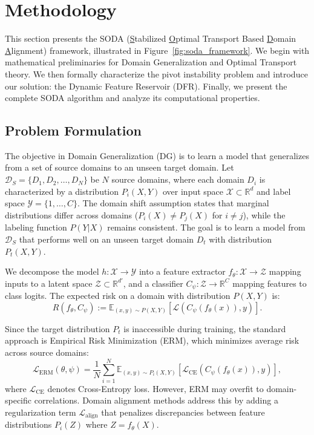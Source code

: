 \section{Methodology}
\label{sec:methodology}


This section presents the SODA (\underline{S}tabilized \underline{O}ptimal Transport Based \underline{D}omain \underline{A}lignment) framework, illustrated in Figure~\ref{fig:soda_framework}. We begin with mathematical preliminaries for Domain Generalization and Optimal Transport theory. We then formally characterize the pivot instability problem and introduce our solution: the Dynamic Feature Reservoir (DFR). Finally, we present the complete SODA algorithm and analyze its computational properties.

\subsection{Problem Formulation}
\label{ssec:problem}

The objective in Domain Generalization (DG) is to learn a model that generalizes from a set of source domains to an unseen target domain. Let $\mathcal{D}_S = \{D_1, D_2, \dots, D_N\}$ be $N$ source domains, where each domain $D_i$ is characterized by a distribution $P_i(X, Y)$ over input space $\mathcal{X} \subset \mathbb{R}^d$ and label space $\mathcal{Y} = \{1, \dots, C\}$. The domain shift assumption states that marginal distributions differ across domains ($P_i(X) \neq P_j(X)$ for $i \neq j$), while the labeling function $P(Y|X)$ remains consistent. The goal is to learn a model from $\mathcal{D}_S$ that performs well on an unseen target domain $D_t$ with distribution $P_t(X, Y)$.

We decompose the model $h: \mathcal{X} \to \mathcal{Y}$ into a feature extractor $f_\theta: \mathcal{X} \to \mathcal{Z}$ mapping inputs to a latent space $\mathcal{Z} \subset \mathbb{R}^{d'}$, and a classifier $C_\psi: \mathcal{Z} \to \mathbb{R}^C$ mapping features to class logits. The expected risk on a domain with distribution $P(X,Y)$ is:
\begin{equation}
    R(f_\theta, C_\psi) := \mathbb{E}_{(x,y) \sim P(X,Y)} [\mathcal{L}(C_\psi(f_\theta(x)), y)].
\end{equation}

Since the target distribution $P_t$ is inaccessible during training, the standard approach is Empirical Risk Minimization (ERM), which minimizes average risk across source domains:
\begin{equation}
    \mathcal{L}_{\text{ERM}}(\theta, \psi) = \frac{1}{N} \sum_{i=1}^{N} \mathbb{E}_{(x,y) \sim P_i(X,Y)} [\mathcal{L}_{\text{CE}}(C_\psi(f_\theta(x)), y)],
    \label{eq:erm}
\end{equation}
where $\mathcal{L}_{\text{CE}}$ denotes Cross-Entropy loss. However, ERM may overfit to domain-specific correlations. Domain alignment methods address this by adding a regularization term $\mathcal{L}_{\text{align}}$ that penalizes discrepancies between feature distributions $P_i(Z)$ where $Z = f_\theta(X)$.

